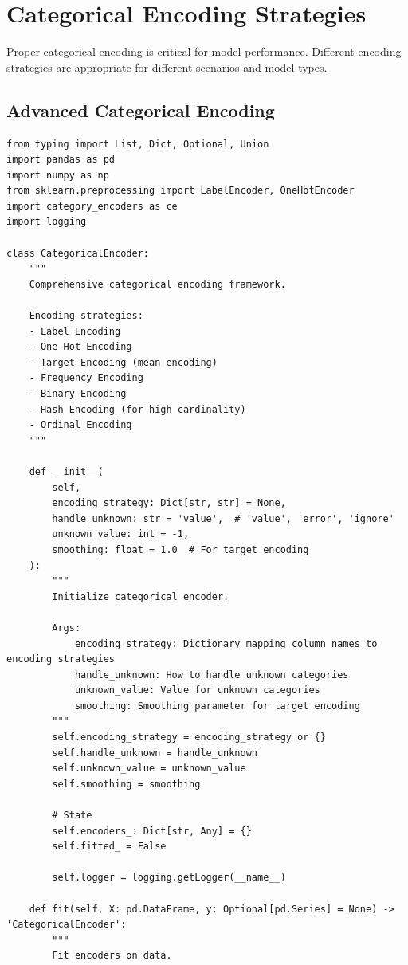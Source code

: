 \section{Categorical Encoding Strategies}

Proper categorical encoding is critical for model performance. Different encoding strategies are appropriate for different scenarios and model types.

\subsection{Advanced Categorical Encoding}

\begin{lstlisting}[style=python, caption={Comprehensive Categorical Encoding Framework}]
from typing import List, Dict, Optional, Union
import pandas as pd
import numpy as np
from sklearn.preprocessing import LabelEncoder, OneHotEncoder
import category_encoders as ce
import logging

class CategoricalEncoder:
    """
    Comprehensive categorical encoding framework.

    Encoding strategies:
    - Label Encoding
    - One-Hot Encoding
    - Target Encoding (mean encoding)
    - Frequency Encoding
    - Binary Encoding
    - Hash Encoding (for high cardinality)
    - Ordinal Encoding
    """

    def __init__(
        self,
        encoding_strategy: Dict[str, str] = None,
        handle_unknown: str = 'value',  # 'value', 'error', 'ignore'
        unknown_value: int = -1,
        smoothing: float = 1.0  # For target encoding
    ):
        """
        Initialize categorical encoder.

        Args:
            encoding_strategy: Dictionary mapping column names to encoding strategies
            handle_unknown: How to handle unknown categories
            unknown_value: Value for unknown categories
            smoothing: Smoothing parameter for target encoding
        """
        self.encoding_strategy = encoding_strategy or {}
        self.handle_unknown = handle_unknown
        self.unknown_value = unknown_value
        self.smoothing = smoothing

        # State
        self.encoders_: Dict[str, Any] = {}
        self.fitted_ = False

        self.logger = logging.getLogger(__name__)

    def fit(self, X: pd.DataFrame, y: Optional[pd.Series] = None) -> 'CategoricalEncoder':
        """
        Fit encoders on data.


\end{lstlisting}
